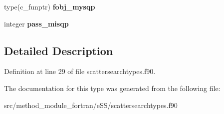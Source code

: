 \begin{DoxyCompactItemize}
\item 
\hypertarget{structscattersearchtypes_1_1local__solver__help__vars_affbc6b0ad13aebba5871ef7606185b17}{type(c\-\_\-funptr) {\bfseries fobj\-\_\-mysqp}}\label{structscattersearchtypes_1_1local__solver__help__vars_affbc6b0ad13aebba5871ef7606185b17}

\item 
\hypertarget{structscattersearchtypes_1_1local__solver__help__vars_ae989c28cf9d323d1f928eac87a8e598c}{integer {\bfseries pass\-\_\-misqp}}\label{structscattersearchtypes_1_1local__solver__help__vars_ae989c28cf9d323d1f928eac87a8e598c}

\end{DoxyCompactItemize}


\subsection{Detailed Description}


Definition at line 29 of file scattersearchtypes.\-f90.



The documentation for this type was generated from the following file\-:\begin{DoxyCompactItemize}
\item 
src/method\-\_\-module\-\_\-fortran/e\-S\-S/scattersearchtypes.\-f90\end{DoxyCompactItemize}
